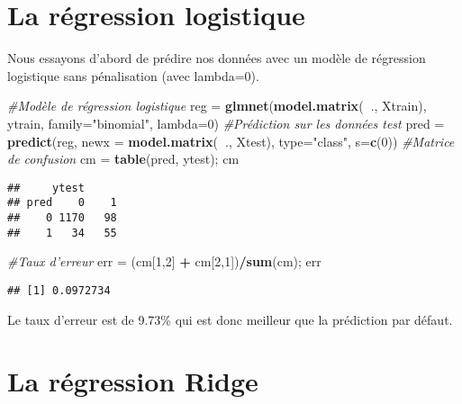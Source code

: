 \documentclass[
]{article}
\newenvironment{Shaded}{\begin{snugshade}}{\end{snugshade}}
\newcommand{\CommentTok}[1]{\textcolor[rgb]{0.56,0.35,0.01}{\textit{#1}}}
\newcommand{\DataTypeTok}[1]{\textcolor[rgb]{0.13,0.29,0.53}{#1}}
\newcommand{\DecValTok}[1]{\textcolor[rgb]{0.00,0.00,0.81}{#1}}
\newcommand{\KeywordTok}[1]{\textcolor[rgb]{0.13,0.29,0.53}{\textbf{#1}}}
\newcommand{\NormalTok}[1]{#1}
\newcommand{\OperatorTok}[1]{\textcolor[rgb]{0.81,0.36,0.00}{\textbf{#1}}}
\newcommand{\StringTok}[1]{\textcolor[rgb]{0.31,0.60,0.02}{#1}}
\begin{document}
\hypertarget{la-ruxe9gression-logistique}{%
\section{La régression logistique}\label{la-ruxe9gression-logistique}}

Nous essayons d'abord de prédire nos données avec un modèle de
régression logistique sans pénalisation (avec lambda=0).

\begin{Shaded}
\begin{Highlighting}[]
\CommentTok{#Modèle de régression logistique}
\NormalTok{reg =}\StringTok{ }\KeywordTok{glmnet}\NormalTok{(}\KeywordTok{model.matrix}\NormalTok{(}\OperatorTok{~}\NormalTok{., Xtrain), ytrain, }\DataTypeTok{family=}\StringTok{"binomial"}\NormalTok{, }\DataTypeTok{lambda=}\DecValTok{0}\NormalTok{) }
\CommentTok{#Prédiction sur les données test}
\NormalTok{pred =}\StringTok{ }\KeywordTok{predict}\NormalTok{(reg, }\DataTypeTok{newx =} \KeywordTok{model.matrix}\NormalTok{(}\OperatorTok{~}\NormalTok{., Xtest), }\DataTypeTok{type=}\StringTok{"class"}\NormalTok{, }\DataTypeTok{s=}\KeywordTok{c}\NormalTok{(}\DecValTok{0}\NormalTok{))}
\CommentTok{#Matrice de confusion}
\NormalTok{cm =}\StringTok{ }\KeywordTok{table}\NormalTok{(pred, ytest); cm}
\end{Highlighting}
\end{Shaded}

\begin{verbatim}
##     ytest
## pred    0    1
##    0 1170   98
##    1   34   55
\end{verbatim}

\begin{Shaded}
\begin{Highlighting}[]
\CommentTok{#Taux d'erreur}
\NormalTok{err =}\StringTok{ }\NormalTok{(cm[}\DecValTok{1}\NormalTok{,}\DecValTok{2}\NormalTok{] }\OperatorTok{+}\StringTok{ }\NormalTok{cm[}\DecValTok{2}\NormalTok{,}\DecValTok{1}\NormalTok{])}\OperatorTok{/}\KeywordTok{sum}\NormalTok{(cm); err}
\end{Highlighting}
\end{Shaded}

\begin{verbatim}
## [1] 0.0972734
\end{verbatim}

Le taux d'erreur est de 9.73\% qui est donc meilleur que la prédiction
par défaut.

\hypertarget{la-ruxe9gression-ridge}{%
\section{La régression Ridge}\label{la-ruxe9gression-ridge}}
\end{document}
